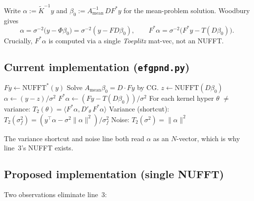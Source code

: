 \documentclass[11pt]{article}
\newcommand{\Ktil}{\widetilde K}
\begin{document}
Write $\alpha := \Ktil^{-1} y$ and $\beta_0 := A_{\text{mean}}^{-1}\,D F^*y$ for the mean-problem solution. Woodbury gives
\begin{equation}
  \alpha = \sigma^{-2}\bigl(y - \Phi \beta_0\bigr) = \sigma^{-2}(y - FD\beta_0),
  \qquad
  F^*\alpha = \sigma^{-2}\bigl(F^*y - T(D\beta_0)\bigr).
\end{equation}
Crucially, $F^*\alpha$ is computed via a single \emph{Toeplitz} mat-vec, not an NUFFT.

\subsection{Current implementation (\texttt{efgpnd.py})}

\begin{algorithm}[h]
\caption{Current $T_2$ path for all hypers.}
\begin{algorithmic}[1]
\State $Fy \leftarrow \text{NUFFT}^*(y)$ 
\State Solve $A_{\text{mean}}\beta_0 = D\cdot Fy$ by CG.
\State $z \leftarrow \text{NUFFT}(D\beta_0)$ 
\State $\alpha \leftarrow (y - z)/\sigma^2$
\State $F^*\alpha \leftarrow (Fy - T(D\beta_0))/\sigma^2$ 
\State For each kernel hyper $\theta$ $\ne$ variance: $T_2(\theta) = \langle F^*\alpha, D'_\theta\, F^*\alpha\rangle$
\State Variance (shortcut): $T_2(\sigma_f^2) = (y^\top\alpha - \sigma^2\|\alpha\|^2)/\sigma_f^2$
\State Noise: $T_2(\sigma^2) = \|\alpha\|^2$
\end{algorithmic}
\end{algorithm}

The variance shortcut and noise line both read $\alpha$ as an $N$-vector, which is why line~3's NUFFT exists.

\subsection{Proposed implementation (single NUFFT)}

Two observations eliminate line~3:
\end{document}
